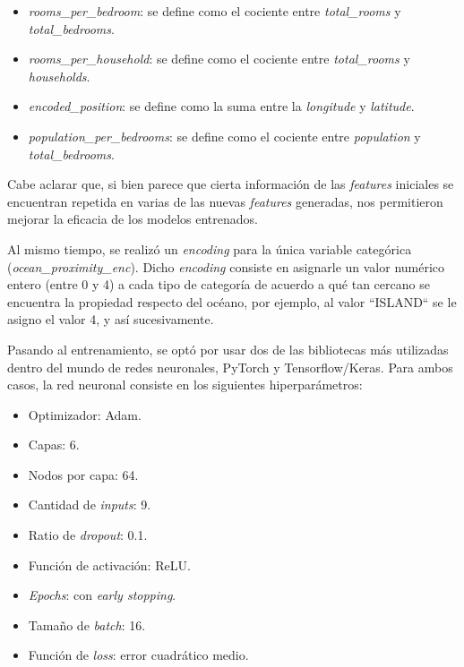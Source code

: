 \documentclass[11pt]{article}
\newcommand{\english}[1]{\textit{#1}}
\begin{document}
\begin{itemize}
    \item \english{rooms\_per\_bedroom}: se define como el cociente entre \english{total\_rooms} y \english{total\_bedrooms}.
    \item \english{rooms\_per\_household}: se define como el cociente entre \english{total\_rooms} y \english{households}.
    \item \english{encoded\_position}: se define como la suma entre la \english{longitude} y \english{latitude}.
    \item \english{population\_per\_bedrooms}: se define como el cociente entre \english{population} y \english{total\_bedrooms}.
\end{itemize}

Cabe aclarar que, si bien parece que cierta información de las \english{features} iniciales se encuentran repetida en varias de las nuevas \english{features} generadas, nos permitieron mejorar la eficacia de los modelos entrenados.

Al mismo tiempo, se realizó un \english{encoding} para la única variable categórica (\english{ocean\_proximity\_enc}). Dicho \english{encoding} consiste en asignarle un valor numérico entero (entre 0 y 4) a cada tipo de categoría de acuerdo a qué tan cercano se encuentra la propiedad respecto del océano, por ejemplo, al valor ``ISLAND`` se le asigno el valor 4, y así sucesivamente.

Pasando al entrenamiento, se optó por usar dos de las bibliotecas más utilizadas dentro del mundo de redes neuronales, PyTorch y Tensorflow/Keras. Para ambos casos, la red neuronal consiste en los siguientes hiperparámetros:

\begin{itemize}
    \item Optimizador: Adam.
    \item Capas: 6.
    \item Nodos por capa: 64.
    \item Cantidad de \english{inputs}: 9.
    \item Ratio de \english{dropout}: 0.1.
    \item Función de activación: ReLU.
    \item \english{Epochs}:  con \english{early stopping}.
    \item Tamaño de \english{batch}: 16.
    \item Función de \english{loss}: error cuadrático medio.
\end{itemize}
\end{document}
